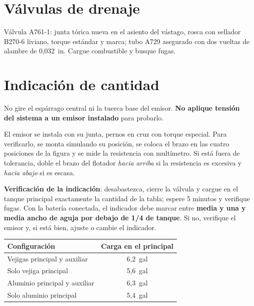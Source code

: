 \section{Válvulas de drenaje}

Válvula A761-1: junta tórica nueva en el asiento del vástago, rosca con sellador B270-6 liviano, torque estándar y marca; tubo A729 asegurado con dos vueltas de alambre de 0,032~in. Cargue combustible y busque fugas.

\section{Indicación de cantidad}

\begin{precaucion}
No gire el espárrago central ni la tuerca base del emisor. \textbf{No aplique tensión del sistema a un emisor instalado} para probarlo.
\end{precaucion}

El emisor se instala con su junta, pernos en cruz con torque especial. Para verificarlo, se monta simulando su posición, se coloca el brazo en las cuatro posiciones de la figura y se mide la resistencia con multímetro. Si está fuera de tolerancia, doble el brazo del flotador \emph{hacia arriba} si la resistencia es excesiva y \emph{hacia abajo} si es escasa.


\textbf{Verificación de la indicación}: desabastezca, cierre la válvula y cargue en el tanque principal exactamente la cantidad de la tabla; espere 5 minutos y verifique fugas. Con la batería conectada, el indicador debe marcar entre \textbf{media y una y media ancho de aguja por debajo de 1/4 de tanque}. Si no, verifique el emisor y, si está bien, ajuste o cambie el indicador.

\begin{center}
\begin{tabular}{lc}
\toprule
Configuración & Carga en el principal \\
\midrule
Vejigas principal y auxiliar & 6,2~gal \\
Solo vejiga principal & 5,6~gal \\
Aluminio principal y auxiliar & 6,3~gal \\
Solo aluminio principal & 5,4~gal \\
\bottomrule
\end{tabular}
\end{center}

